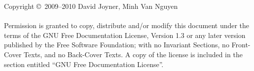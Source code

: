 \noindent Copyright \copyright\ 2009--2010 David Joyner, Minh Van Nguyen \\\\
Permission is granted to copy, distribute and/or modify this document
under the terms of the GNU Free Documentation License, Version 1.3
or any later version published by the Free Software Foundation;
with no Invariant Sections, no Front-Cover Texts, and no
Back-Cover Texts. A copy of the license is included in the section
entitled ``GNU Free Documentation License''.
